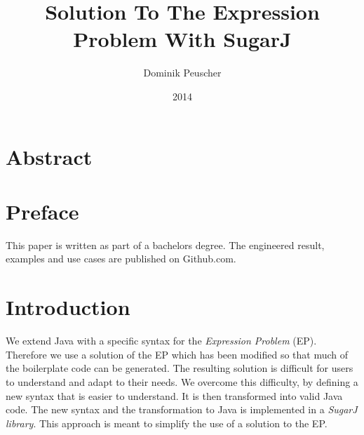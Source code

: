 \documentclass{report}
\author{Dominik Peuscher}
\title{Solution To The Expression Problem With SugarJ}
\date{2014}
\affil{Department of Computer Science\\ University of Marburg}
\begin{document}

\maketitle

\tableofcontents
\listoffigures

\chapter*{Abstract}


\chapter*{Preface}

This paper is written as part of a bachelors degree. The engineered result, examples and use cases are published on Github.com\cite{Peuscher-GitHub-EP-2014}.%



\chapter{Introduction}

We extend Java with a specific syntax for the \emph{Expression Problem} (EP). Therefore we use a solution of the EP which has been modified so that much of the boilerplate code can be generated. The resulting solution is difficult for users to understand and adapt to their needs. We overcome this difficulty, by defining a new syntax that is easier to understand. It is then transformed into valid Java code. The new syntax and the transformation to Java is implemented in a \emph{SugarJ library}. This approach is meant to simplify the use of a solution to the EP.
\end{document}
